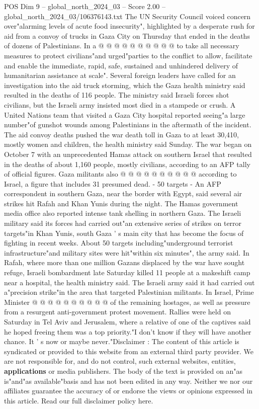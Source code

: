 \begin{textsample}{POS Dim 9 – global\_north\_2024\_03 – Score 2.00 – global\_north\_2024\_03/106376143.txt}
The UN Security Council voiced concern over"alarming levels of acute food insecurity", highlighted by a desperate rush for aid from a convoy of trucks in Gaza City on Thursday that ended in the deaths of dozens of Palestinians.
In a @ @ @ @ @ @ @ @ @ @ to take all necessary measures to protect civilians"and urged"parties to the conflict to allow, facilitate and enable the immediate, rapid, safe, sustained and unhindered delivery of humanitarian assistance at scale".
Several foreign leaders have called for an investigation into the aid truck storming, which the Gaza health ministry said resulted in the deaths of 116 people.
The ministry said Israeli forces shot civilians, but the Israeli army insisted most died in a stampede or crush.
A United Nations team that visited a Gaza City hospital reported seeing"a large number"of gunshot wounds among Palestinians in the aftermath of the incident.
The aid convoy deaths pushed the war death toll in Gaza to at least 30,410, mostly women and children, the health ministry said Sunday.
The war began on October 7 with an unprecedented Hamas attack on southern Israel that resulted in the deaths of about 1,160 people, mostly civilians, according to an AFP tally of official figures.
Gaza militants also @ @ @ @ @ @ @ @ @ @ according to Israel, a figure that includes 31 presumed dead. - 50 targets - An AFP correspondent in southern Gaza, near the border with Egypt, said several air strikes hit Rafah and Khan Yunis during the night.
The Hamas government media office also reported intense tank shelling in northern Gaza.
The Israeli military said its forces had carried out"an extensive series of strikes on terror targets"in Khan Yunis, south Gaza ' s main city that has become the focus of fighting in recent weeks.
About 50 targets including"underground terrorist infrastructure"and military sites were hit"within six minutes", the army said.
In Rafah, where more than one million Gazans displaced by the war have sought refuge, Israeli bombardment late Saturday killed 11 people at a makeshift camp near a hospital, the health ministry said.
The Israeli army said it had carried out a"precision strike"in the area that targeted Palestinian militants.
In Israel, Prime Minister @ @ @ @ @ @ @ @ @ @ of the remaining hostages, as well as pressure from a resurgent anti-government protest movement.
Rallies were held on Saturday in Tel Aviv and Jerusalem, where a relative of one of the captives said he hoped freeing them was a top priority."I don't know if they will have another chance.
It ' s now or maybe never."Disclaimer : The content of this article is syndicated or provided to this website from an external third party provider.
We are not responsible for, and do not control, such external websites, entities, \textbf{applications} or media publishers.
The body of the text is provided on an"as is"and"as available"basis and has not been edited in any way.
Neither we nor our affiliates guarantee the accuracy of or endorse the views or opinions expressed in this article.
Read our full disclaimer policy here.

\end{textsample}

